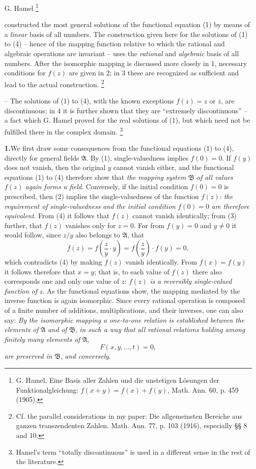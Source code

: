 \documentclass[11pt]{article}
\providecommand{\Afield}{\mathfrak A}
\providecommand{\Bfield}{\mathfrak B}
\providecommand{\srcfn}[2]{%
  \begingroup
  \renewcommand{\thefootnote}{#1}%
  \footnote{#2}%
  \addtocounter{footnote}{-1}%
  \endgroup}
\begin{document}
G. Hamel\srcfn{*)}{G. Hamel, Eine Basis aller Zahlen und die unstetigen Lösungen der Funktionalgleichung: \(f(x+y)=f(x)+f(y)\), Math. Ann. 60, p. 459 (1905).} constructed the most general solutions of the functional equation (1) by means of a \emph{linear} basis of all numbers. The construction given here for the solutions of (1) to (4) -- hence of the mapping function relative to which the rational and algebraic operations are invariant -- uses the \emph{rational} and \emph{algebraic} basis of all numbers. After the isomorphic mapping is discussed more closely in 1, necessary conditions for \(f(z)\) are given in 2; in 3 these are recognized as sufficient and lead to the actual construction.\srcfn{**)}{Cf. the parallel considerations in my paper: Die allgemeinsten Bereiche aus ganzen transzendenten Zahlen. Math. Ann. 77, p. 103 (1916), especially §§ 8 and 10.} -- The solutions of (1) to (4), with the known exceptions \(f(z)=z\) or \(\overline z\), are discontinuous; in 4 it is further shown that they are ``extremely discontinuous'' -- a fact which G. Hamel proved for the real solutions of (1), but which need not be fulfilled there in the complex domain.\srcfn{***)}{Hamel's term ``totally discontinuous'' is used in a different sense in the rest of the literature.}

\medskip
\noindent\textbf{1.}\quad We first draw some consequences from the functional equations (1) to (4), directly for general fields \(\Afield\). By (1), single-valuedness implies \(f(0)=0\). If \(f(y)\) does not vanish, then the original \(y\) cannot vanish either, and the functional equations (1) to (4) therefore show that \emph{the mapping system} \(\Bfield\) \emph{of all values} \(f(z)\) \emph{again forms a field}. Conversely, if the initial condition \(f(0)=0\) is prescribed, then (2) implies the single-valuedness of the function \(f(z)\): \emph{the requirement of single-valuedness and the initial condition} \(f(0)=0\) \emph{are therefore equivalent}. From (4) it follows that \(f(z)\) cannot vanish identically; from (3) further, that \(f(z)\) vanishes only for \(z=0\). For from \(f(y)=0\) and \(y\ne0\) it would follow, since \(z/y\) also belongs to \(\Afield\), that
\[
f(z)=f\!\left(\frac{z}{y}\cdot y\right)=f\!\left(\frac{z}{y}\right)\cdot f(y)=0,
\]
which contradicts (4) by making \(f(z)\) vanish identically. From \(f(x)=f(y)\) it follows therefore that \(x=y\); that is, to each value of \(f(z)\) there also corresponds one and only one value of \(z\): \emph{\(f(z)\) is a reversibly single-valued function of} \(z\). As the functional equations show, the mapping mediated by the inverse function is again isomorphic. Since every rational operation is composed of a finite number of additions, multiplications, and their inverses, one can also say: \emph{By the isomorphic mapping a one-to-one relation is established between the elements of} \(\Afield\) \emph{and of} \(\Bfield\), \emph{in such a way that all rational relations holding among finitely many elements of} \(\Afield\),
\[
F(x,y,\ldots,t)=0,
\]
\emph{are preserved in} \(\Bfield\), \emph{and conversely}.
\end{document}
